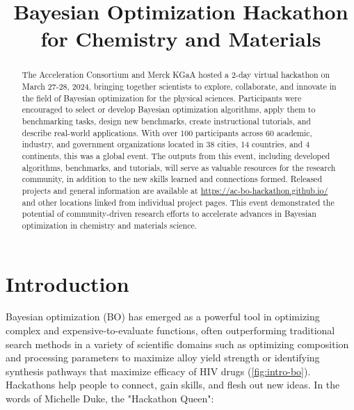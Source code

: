 \documentclass[superscriptaddress, nofootinbib,  amsmath, amssymb, twocolumn]{revtex4-2}
\begin{document}
\title{Bayesian Optimization Hackathon for Chemistry and Materials}

% 




\begin{abstract}
The Acceleration Consortium and Merck KGaA hosted a 2-day virtual hackathon on March 27-28, 2024, bringing together scientists to explore, collaborate, and innovate in the field of Bayesian optimization for the physical sciences. Participants were encouraged to select or develop Bayesian optimization algorithms, apply them to benchmarking tasks, design new benchmarks, create instructional tutorials, and describe real-world applications. With over 100 participants across 60 academic, industry, and government organizations located in 38 cities, 14 countries, and 4 continents, this was a global event. %
The outputs from this event, including developed algorithms, benchmarks, and tutorials, will serve as valuable resources for the research community, in addition to the new skills learned and connections formed. Released projects and general information are available at \url{https://ac-bo-hackathon.github.io/} and other locations linked from individual project pages. This event demonstrated the potential of community-driven research efforts to accelerate advances in Bayesian optimization in chemistry and materials science.
\end{abstract}

\maketitle



\section{Introduction}

Bayesian optimization (BO) has emerged as a powerful tool in optimizing complex and expensive-to-evaluate functions, often outperforming traditional search methods in a variety of scientific domains such as optimizing composition and processing parameters to maximize alloy yield strength or identifying synthesis pathways that maximize efficacy of HIV drugs (\cref{fig:intro-bo}). Hackathons help people to connect, gain skills, and flesh out new ideas. In the words of Michelle Duke, the "Hackathon Queen":
\end{document}
